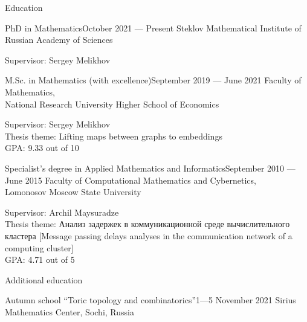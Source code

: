 \documentclass{resume}
\begin{document}
\begin{rSection}{Education}
\begin{rSubsection}{PhD in Mathematics}{October 2021 --- Present}{}
  Steklov Mathematical Institute of Russian Academy of Sciences\vspace{0.5em}

  Supervisor: Sergey Melikhov
\end{rSubsection}

\begin{rSubsection}{M.Sc. in Mathematics (with excellence)}{September 2019 --- June 2021}{}
  Faculty of Mathematics, \\
  National Research University Higher School of Economics \vspace{0.5em}

  Supervisor: Sergey Melikhov \\
  Thesis theme: Lifting maps between graphs to embeddings \\
  GPA: 9.33 out of 10
\end{rSubsection}

\begin{rSubsection}{Specialist's degree in Applied Mathematics and Informatics}{September 2010 --- June 2015}{}
  Faculty of Computational Mathematics and Cybernetics, \\
  Lomonosov Moscow State University \vspace{0.5em}

  Supervisor: Archil Maysuradze \\
  Thesis theme: Анализ задержек в коммуникационной среде вычислительного кластера [Message passing
  delays analyses in the communication network of a computing cluster] \\
  GPA: 4.71 out of 5
\end{rSubsection}
\end{rSection}

\begin{rSection}{Additional education}
  \begin{rSubsection}{Autumn school ``Toric topology and combinatorics''}{1---5 November 2021}{} 
    Sirius Mathematics Center, Sochi, Russia
  \end{rSubsection}
\end{rSection}
\end{document}
